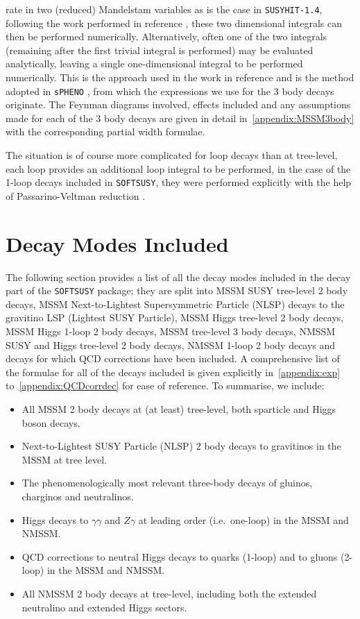 \documentclass[final,3p,times]{elsarticle}
\begin{document}
rate in two (reduced) Mandelstam variables as is the case in {\tt SUSYHIT-1.4},
following the work performed in reference \cite{Mambrini:2001}, these
two dimensional integrals can then be performed numerically. Alternatively, often
one of the two integrals (remaining after the first trivial integral is 
performed) may be evaluated analytically, leaving a single one-dimensional
integral to be performed numerically. This is the approach used in the work
in reference \cite{Baer:1998} and is the method adopted in {\tt sPHENO} 
\cite{Porod:2003um, Porod:2011}, from which the expressions we use
for the 3 body decays originate. The Feynman diagrams involved, effects
included and any assumptions made for each of the 3 body decays are 
given in detail in~\ref{appendix:MSSM3body} with the corresponding partial
width formulae.

The situation is of course more complicated for loop decays than at tree-level,
each loop provides an additional loop integral to be performed, in the case
of the 1-loop decays included in {\tt SOFTSUSY},  they were performed
explicitly with the help of Passarino-Veltman reduction \cite{Passarino:1979}.

\section{Decay Modes Included \label{sec:list}}
The following section provides a list of all the decay modes included in the
decay part of the {\tt SOFTSUSY} package; they are split into MSSM SUSY
tree-level 2 body decays, MSSM Next-to-Lightest Supersymmetric Particle (NLSP) decays
to the gravitino LSP (Lightest SUSY Particle), MSSM Higgs tree-level 2 body decays, MSSM Higgs
1-loop 2 body decays, MSSM tree-level 3 body decays,  NMSSM SUSY and Higgs tree-level 2 body decays, NMSSM
1-loop 2 body decays and decays for which QCD corrections have been
included. A comprehensive list of the formulae for all of the decays included
is given explicitly in~\ref{appendix:exp} to~\ref{appendix:QCDcorrdec} for
ease of reference. To summarise, we include:
\begin{itemize}
\item All MSSM 2 body decays at (at least) tree-level, both sparticle and
  Higgs boson decays. 
\item Next-to-Lightest SUSY Particle (NLSP) 2 body decays to gravitinos in the
  MSSM at tree level.
\item The phenomenologically most relevant three-body decays of gluinos, charginos and neutralinos.
\item Higgs decays to $\gamma\gamma$ and $Z\gamma$ at leading order (i.e.\ one-loop) in the MSSM and NMSSM.
\item QCD corrections to neutral Higgs decays to quarks (1-loop) and to gluons (2-loop) in the MSSM and NMSSM.
\item All NMSSM 2 body decays at tree-level, including both the extended neutralino and extended Higgs sectors.
\end{itemize}
\end{document}
